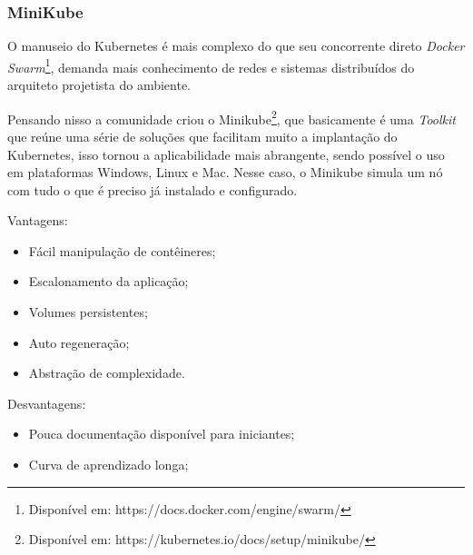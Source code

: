 \subsubsection{MiniKube}
O manuseio do Kubernetes é mais complexo do que seu concorrente direto \textit{Docker Swarm}\footnote{Disponível em: https://docs.docker.com/engine/swarm/}, demanda mais conhecimento de redes e sistemas distribuídos do arquiteto projetista do ambiente.

Pensando nisso a comunidade criou o Minikube\footnote{Disponível em: https://kubernetes.io/docs/setup/minikube/}, que basicamente é uma \textit{Toolkit} que reúne uma série de soluções que facilitam muito a implantação do Kubernetes, isso tornou a aplicabilidade mais abrangente, sendo possível o uso em plataformas Windows, Linux e Mac. Nesse caso, o Minikube simula um nó com tudo o que é preciso já instalado e configurado.\cite{mceniry2017kubernetes}


Vantagens:
\begin{itemize}
\item Fácil manipulação de contêineres;
\item Escalonamento da aplicação;
\item Volumes persistentes;
\item Auto regeneração;
\item Abstração de complexidade.
\end{itemize}

Desvantagens:
\begin{itemize}
\item Pouca documentação disponível para iniciantes;
\item Curva de aprendizado longa;

\end{itemize}



